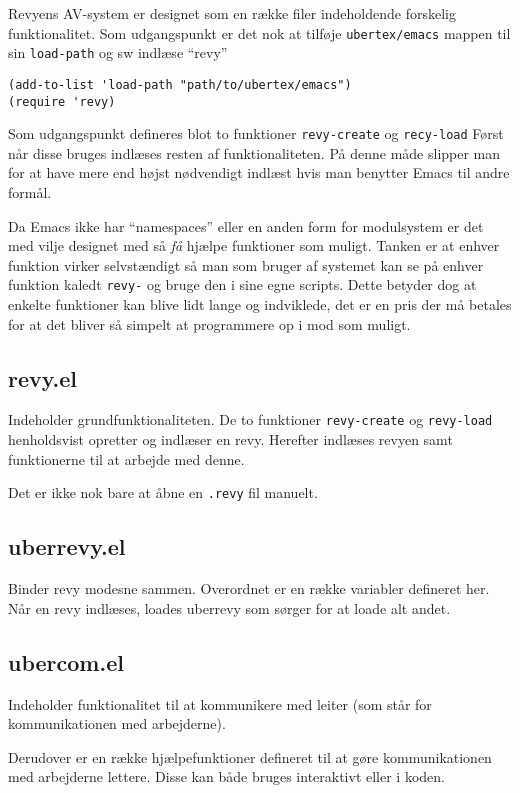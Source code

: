 \documentclass[10pt,a4paper,danish]{article}
\let\oldmarginnote\marginnote
\renewcommand{\marginnote}[1]{\oldmarginnote{\raggedright{}\footnotesize #1}}
\newcommand{\code}[1]{\colorbox{verbgray}{\texttt{#1}}}
\begin{document}
Revyens AV-system er designet som en række filer indeholdende forskelig
funktionalitet. Som udgangspunkt er det nok at tilføje \code{ubertex/emacs}
mappen til sin \code{load-path} og sw indlæse ``revy''

\begin{verbatim}
(add-to-list 'load-path "path/to/ubertex/emacs")
(require 'revy)
\end{verbatim}

Som udgangspunkt defineres blot to funktioner \code{revy-create} og
\code{recy-load} Først når disse bruges indlæses resten af funktionaliteten. På
denne måde slipper man for at have mere end højst nødvendigt indlæst hvis man
benytter Emacs til andre formål.

Da Emacs ikke har ``namespaces'' eller en anden form for modulsystem er det med
vilje designet med så \textit{få} hjælpe funktioner som muligt. Tanken er at
enhver funktion virker selvstændigt så man som bruger af systemet kan se på
enhver funktion kaledt \code{revy-} og bruge den i sine egne scripts.
Dette betyder dog at enkelte funktioner kan blive lidt lange og indviklede, det
er en pris der må betales for at det bliver så simpelt at programmere op i mod
som muligt.\marginnote{Implementerings noter?}

\subsection{revy.el}
Indeholder grundfunktionaliteten. De to funktioner \code{revy-create} og
\code{revy-load} henholdsvist opretter og indlæser en revy. Herefter indlæses
revyen samt funktionerne til at arbejde med denne.

Det er ikke nok bare at åbne en \code{.revy} fil manuelt.

\subsection{uberrevy.el}
Binder revy modesne sammen. Overordnet er en række variabler defineret her. Når
en revy indlæses, loades uberrevy som sørger for at loade alt andet.

\subsection{ubercom.el}
Indeholder funktionalitet til at kommunikere med leiter (som står for
kommunikationen med arbejderne).

Derudover er en række hjælpefunktioner defineret til at gøre kommunikationen med
arbejderne lettere. Disse kan både bruges interaktivt eller i koden.
\end{document}
